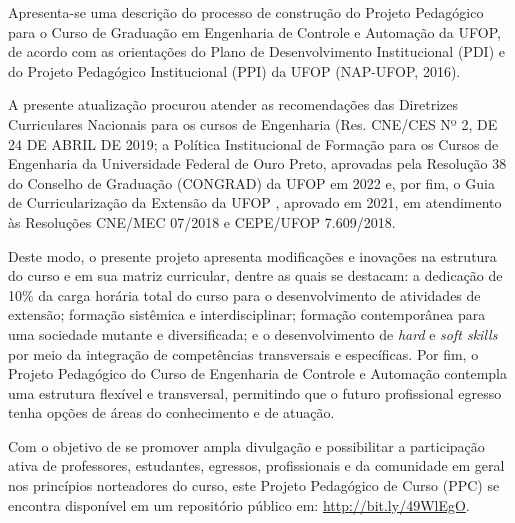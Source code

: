 \documentclass[
	12pt,				%
	openright,			%
	oneside,			%
	a4paper,			%
	english,			%
	brazil				%
	]{abntex2}
\begin{document}
Apresenta-se uma descrição do processo de construção do Projeto  Pedagógico para o Curso de Graduação em Engenharia de Controle e Automação da  UFOP, de acordo com as orientações do Plano de Desenvolvimento Institucional (PDI) e  do Projeto Pedagógico Institucional (PPI) da UFOP (NAP-UFOP, 2016).

A presente atualização procurou atender as recomendações das Diretrizes Curriculares Nacionais para os cursos de Engenharia (Res. CNE/CES Nº 2, DE 24 DE ABRIL DE 2019; a Política Institucional de Formação para os Cursos de Engenharia da Universidade Federal de Ouro Preto, aprovadas  pela Resolução 38 do Conselho de Graduação (CONGRAD) da UFOP em 2022 e, por fim, o Guia de Curricularização da Extensão da UFOP , aprovado em 2021, em atendimento às  Resoluções CNE/MEC 07/2018 e CEPE/UFOP 7.609/2018.

Deste modo, o presente projeto apresenta modificações e inovações na estrutura do curso e em sua matriz curricular, dentre as quais se destacam: a dedicação de 10\% da  carga  horária total do curso para o desenvolvimento de atividades de extensão; formação sistêmica e interdisciplinar; formação  contemporânea para uma sociedade mutante e diversificada; e o desenvolvimento de \textit{hard} e \textit{soft skills} por meio da integração de competências transversais e específicas. Por fim, o Projeto Pedagógico do Curso de Engenharia de Controle e Automação contempla uma estrutura flexível e transversal, permitindo que o futuro profissional egresso tenha opções de áreas do conhecimento e de atuação.

Com o objetivo de se promover ampla divulgação e possibilitar a participação ativa de  professores, estudantes, egressos, profissionais e da comunidade em geral nos princípios  norteadores do curso, este Projeto Pedagógico de Curso (PPC) se encontra disponível em um repositório público em: \url{http://bit.ly/49WlEgO}.

\end{document}
